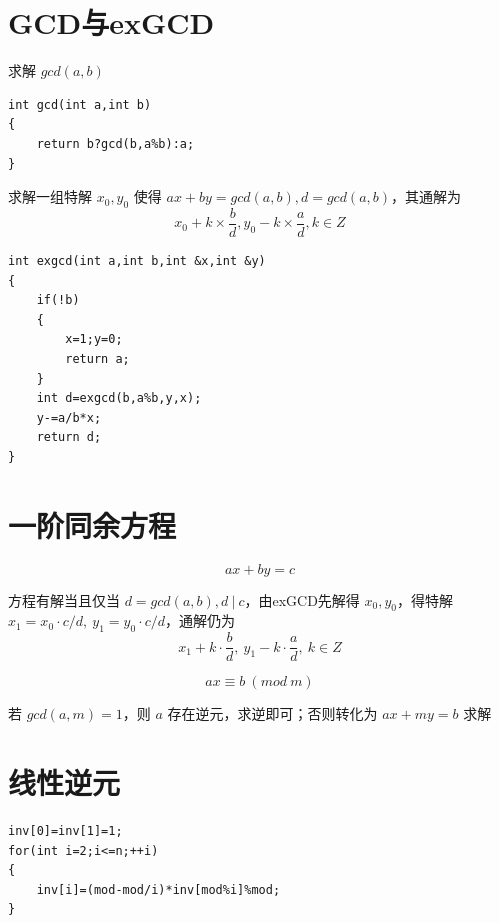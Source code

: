 \section{GCD与exGCD}
\par \noindent 求解 $gcd(a,b)$
\begin{verbatim}
int gcd(int a,int b)
{
    return b?gcd(b,a%b):a;
}
\end{verbatim}

\par \noindent 求解一组特解 $x_0,y_0$ 使得 $ax+by = gcd(a,b),d=gcd(a,b)$，其通解为
$$
x_0+k\times\frac{b}{d},y_0-k\times\frac{a}{d}, k \in Z
$$

\begin{verbatim}
int exgcd(int a,int b,int &x,int &y)
{
    if(!b)
    {
        x=1;y=0;
        return a;
    }
    int d=exgcd(b,a%b,y,x);
    y-=a/b*x;
    return d;
}
\end{verbatim}

\section{一阶同余方程}

$$
ax+by = c
$$

\par \noindent 方程有解当且仅当 $d = gcd(a,b),d\ |\ c$，由exGCD先解得 $x_0,y_0$，得特解 $x_1 = x_0\cdot c/d,\ y_1=y_0\cdot c/d$，通解仍为
$$
x_1 + k\cdot\frac{b}{d},\ y_1-k\cdot\frac{a}{d},\ k\in Z
$$

$$
ax \equiv b\ (mod\ m)
$$

若 $gcd(a,m) = 1$，则 $a$ 存在逆元，求逆即可；否则转化为 $ax + my = b$ 求解

\section{线性逆元}
\begin{verbatim}
inv[0]=inv[1]=1;
for(int i=2;i<=n;++i)
{
    inv[i]=(mod-mod/i)*inv[mod%i]%mod;
}
\end{verbatim}

